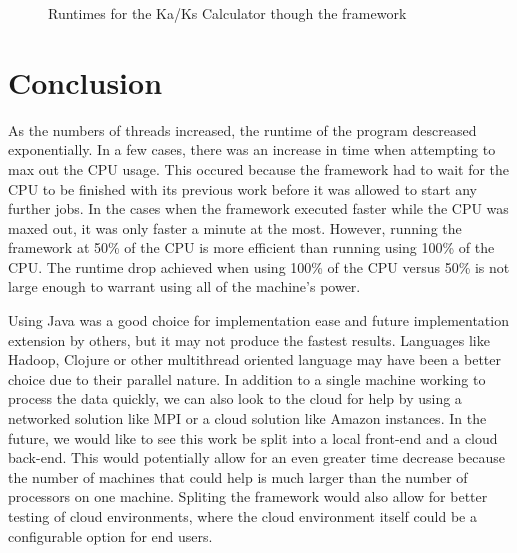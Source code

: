 \documentclass[12pt]{article}
\begin{document}
\begin{figure}
{}
\caption{Runtimes for the Ka/Ks Calculator though the framework}
\label{fig:graph}
\end{figure}

\section{Conclusion}

As the numbers of threads increased, the runtime of the program descreased 
exponentially. In a few cases, there was an increase in time when attempting to 
max out the CPU usage. This occured because the framework had to wait for the 
CPU to be finished with its previous work before it was allowed to start any 
further jobs. In the cases when the framework executed faster while the CPU was 
maxed out, it was only faster a minute at the most. However, running the 
framework at 50\% of the CPU is more efficient than running using 100\% of the 
CPU. The runtime drop achieved when using 100\% of the CPU versus 50\% is not 
large enough to warrant using all of the machine's power.

Using Java was a good choice for implementation ease and future implementation
extension by others, but it may not produce the fastest results. Languages
like Hadoop, Clojure or other multithread oriented language may have been a
better choice due to their parallel nature. In addition to a single machine 
working to process the data quickly, we can also look to the cloud for help by 
using a networked solution like MPI or a cloud solution like Amazon instances. 
In the future, we would like to see this work be split into a local front-end
and a cloud back-end. This would potentially allow for an even greater time 
decrease because the number of machines that could help is much larger than the 
number of processors on one machine. Spliting the framework would also allow for
better testing of cloud environments, where the cloud environment itself could
be a configurable option for end users.
\end{document}
